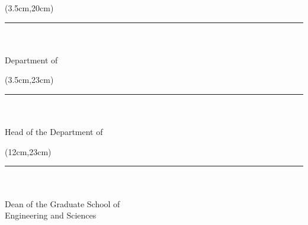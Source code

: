 \begin{spacing}{1}
	\begin{textblock*}{\textwidth}(3.5cm,20cm)
		\noindent\rule{5cm}{0.1mm}\\
		\textbf{\SupervisorTitle{ }\SupervisorName{}
		\MakeUppercase\SupervisorSurname}\\
		Department of \SupervisorDepartment\\
		\SupervisorUniversity
	\end{textblock*}


	\begin{textblock*}{\textwidth}(3.5cm,23cm)
		\noindent\rule{5cm}{0.1mm}\\
		\textbf{\HeadOfTheDepartmentTitle{ }\HeadOfTheDepartmentName{}
		\MakeUppercase\HeadOfTheDepartmentSurname}\\
		Head of the Department of\\
		\HeadOfTheDepartmentDepartment
	\end{textblock*}

	\begin{textblock*}{\textwidth}(12cm,23cm)
		\noindent\rule{5cm}{0.1mm}\\
		\textbf{\HeadOfTheGraduateSchoolTitle{ }\HeadOfTheGraduateSchoolName{}
		\MakeUppercase\HeadOfTheGraduateSchoolSurname}\\
		Dean of the Graduate School of\\
		Engineering and Sciences
	\end{textblock*}
\end{spacing}
~\pagebreak
